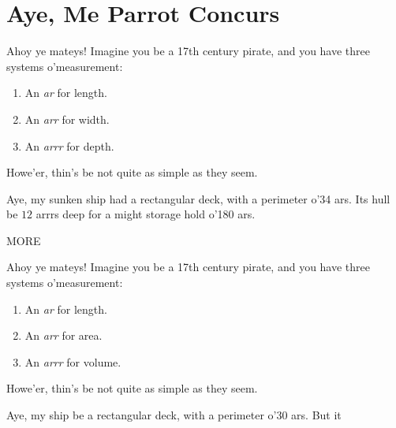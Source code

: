 \newpage
\section{Aye, Me Parrot Concurs}


Ahoy ye mateys! Imagine you be a 17th century pirate, and you have
three systems o'measurement:
\begin{enumerate}
\item An \textit{ar} for length.
\item An \textit{arr} for width.
\item An \textit{arrr} for depth. 
\end{enumerate}
Howe'er, thin's be not quite as simple as they seem.

\begin{prob}
Aye, my sunken ship had a rectangular deck, with a perimeter o'34 ars.
Its hull be $12$ arrrs deep for a might storage hold o'180 ars.
\end{prob}


\begin{prob}
MORE
\end{prob}


Ahoy ye mateys! Imagine you be a 17th century pirate, and you have
three systems o'measurement:
\begin{enumerate}
\item An \textit{ar} for length.
\item An \textit{arr} for area.
\item An \textit{arrr} for volume. 
\end{enumerate}
Howe'er, thin's be not quite as simple as they seem.

\begin{prob}
Aye, my ship be a rectangular deck, with a perimeter o'30 ars.
But it
\end{prob}


